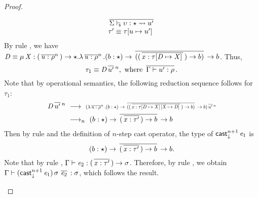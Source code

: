 \begin{proof}
\begin{description}
\[\begin{array}{ll}
                \,\overline{   \Sigma  \vdash_{\!\!\mathsf{s} }  \upsilon  :  \star   \rightsquigarrow   u'   }\, \\
                \tau'  \equiv  \tau  [  u  \mapsto  u'  ] \,
            \end{array}\]
            By rule , we have $\mathit{D}   \equiv  \mu \, \mathit{X} : ( \,\overline{ \mathit{u} : \rho }^{n}\, ) \rightarrow \star . \lambda \,\overline{ \mathit{u} : \rho }^{n}\, . ( b : \star ) \rightarrow \,\overline{ ( ( \,\overline{ \mathit{x} : \tau [ \mathit{D} \mapsto \mathit{X} ] \, }\, ) \rightarrow b ) }\, \rightarrow b$. Thus,
            \[ \tau_{{\mathrm{1}}}  \equiv  \mathit{D} \,\overline{  u'  }\,^n,\text{ where }\,\overline{  \Gamma  \vdash  u'  :  \rho  }\,.\] 
            Note that by operational semantics, the following reduction sequence follows for $\tau_{{\mathrm{1}}}$:
            \begin{align*}
                \ottmv{D} \,\overline{  u'  }\,^n~
                & \longrightarrow ~ \mathscale[0.7]{\ottsym{(}  \lambda  \,\overline{  \ottnt{u}  \ottsym{:}  \rho  }^{n}\,  \ottsym{.}  \ottsym{(}  b  \ottsym{:}  \star  \ottsym{)}  \rightarrow  \,\overline{  \ottsym{(}  \ottsym{(}  \,\overline{  \ottmv{x}  \ottsym{:}  \tau  \ottsym{[}  \ottmv{D}  \mapsto  \ottmv{X}  \ottsym{]} \,  \ottsym{[}  \ottmv{X}  \mapsto  \ottmv{D}  \ottsym{]} \,  }\,  \ottsym{)}  \rightarrow  b  \ottsym{)}  }\,  \rightarrow  b  \ottsym{)}\,\overline{  u'  }\,^n}\\
                & \longrightarrow_n ~ \ottsym{(}  b  \ottsym{:}  \star  \ottsym{)}  \rightarrow  \,\overline{  \ottsym{(}  \,\overline{  \ottmv{x}  \ottsym{:}  \tau'  }\,  \ottsym{)}  \rightarrow  b  }\,  \rightarrow  b
            \end{align*}
            Then by
            rule  and the definition of $n$-step cast operator, the
            type of $\mathsf{cast}_{\downarrow}^{n+1} \, \mathit{e_{{\mathrm{1}}}}$ is \[ (  b  :  \star  )  \rightarrow  \,\overline{  (  \,\overline{  \mathit{x}  :  \tau'  }\,  )  \rightarrow  b  }\,  \rightarrow  b.\] Note
            that by rule , $\Gamma  \vdash  \mathit{e_{{\mathrm{2}}}}  :  (  \,\overline{  \mathit{x}  :  \tau'  }\,  )  \rightarrow  \sigma$. Therefore, by rule
            , we obtain $\Gamma  \vdash  (  \mathsf{cast}_{\downarrow}^{n+1} \, \mathit{e_{{\mathrm{1}}}}  ) \, \sigma \, \,\overline{  \mathit{e_{{\mathrm{2}}}}  }\,  :  \sigma$, which follows
            the result.
    \end{description}
\end{proof}

